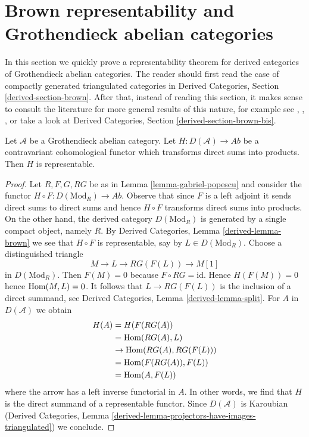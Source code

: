 \section{Brown representability and Grothendieck abelian categories}
\label{section-brown}

\noindent
In this section we quickly prove a representability theorem for
derived categories of Grothendieck abelian categories. The reader should
first read the case of compactly generated triangulated categories in
Derived Categories, Section \ref{derived-section-brown}.
After that, instead of reading this section,
it makes sense to consult the literature for more
general results of this nature, for example see
\cite{Franke}, \cite{Neeman}, \cite{Krause}, or take
a look at Derived Categories, Section \ref{derived-section-brown-bis}.

\begin{lemma}
\label{lemma-brown}
Let $\mathcal{A}$ be a Grothendieck abelian category.
Let $H : D(\mathcal{A}) \to \textit{Ab}$ be a contravariant
cohomological functor which transforms direct sums into products.
Then $H$ is representable.
\end{lemma}

\begin{proof}
Let $R, F, G, RG$ be as in Lemma \ref{lemma-gabriel-popescu}
and consider the functor $H \circ F : D(\text{Mod}_R) \to \textit{Ab}$.
Observe that since $F$ is a left adjoint it sends direct sums to
direct sums and hence $H \circ F$ transforms direct sums into products.
On the other hand, the derived category $D(\text{Mod}_R)$ is
generated by a single compact object, namely $R$.
By Derived Categories, Lemma \ref{derived-lemma-brown}
we see that $H \circ F$ is representable, say by $L \in D(\text{Mod}_R)$.
Choose a distinguished triangle
$$
M \to L \to RG(F(L)) \to M[1]
$$
in $D(\text{Mod}_R)$. Then $F(M) = 0$ because $F \circ RG = \text{id}$.
Hence $H(F(M)) = 0$ hence $\mathop{\mathrm{Hom}}\nolimits(M, L) = 0$.
It follows that $L \to RG(F(L))$ is the inclusion of a direct summand, see
Derived Categories, Lemma \ref{derived-lemma-split}.
For $A$ in $D(\mathcal{A})$ we obtain
\begin{align*}
H(A)
& =
H(F(RG(A)) \\
& =
\mathop{\mathrm{Hom}}\nolimits(RG(A), L) \\
& \to
\mathop{\mathrm{Hom}}\nolimits(RG(A), RG(F(L))) \\
& =
\mathop{\mathrm{Hom}}\nolimits(F(RG(A)), F(L)) \\
& =
\mathop{\mathrm{Hom}}\nolimits(A, F(L))
\end{align*}
where the arrow has a left inverse functorial in $A$. In other words, we find
that $H$ is the direct summand of a representable functor.
Since $D(\mathcal{A})$ is Karoubian
(Derived Categories, Lemma
\ref{derived-lemma-projectors-have-images-triangulated}) we conclude.
\end{proof}

